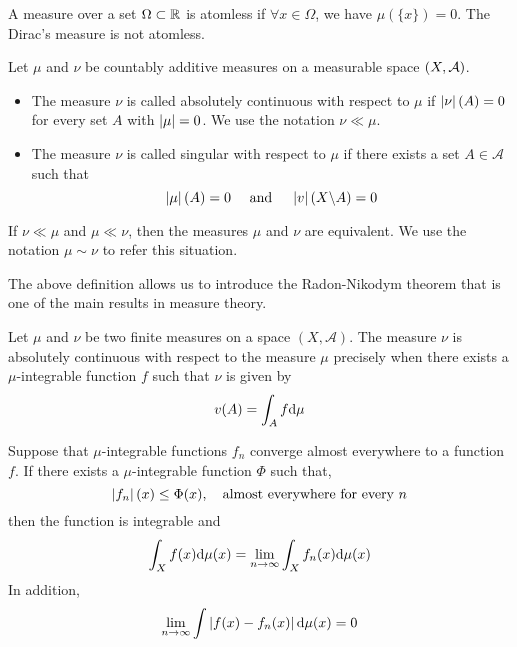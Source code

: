 A measure over a set $\Omega\subset \mathbb{R}$ is atomless if $\forall x \in \Omega$, we have  $\mu(\{x\})=0$. The Dirac's measure is not atomless. 
\begin{definition}
	Let $\mu$ and $\nu$ be countably additive measures on a measurable space $\left( X, \mathcal A \right)$. 
	\begin{itemize}
		\item The measure $\nu$ is called absolutely continuous with respect to $\mu$ if $\left| \nu \right|(A)=0$ for every set $A$ with $\left| \mu \right|=0$. We use the notation $\nu \ll \mu$.
		\item The measure $\nu$ is called singular with respect to $\mu$ if there exists a set $A\in \mathcal{A}$ such that
		\begin{equation*}
			\left| \mu \right|(A)=0 \quad \text{ and }\quad  \left| v \right|(X\backslash A)=0
		\end{equation*}
	\end{itemize}
	
	If $\nu \ll \mu $ and $\mu \ll \nu$, then the measures $\mu$ and $\nu$ are equivalent. We use the notation $\mu \sim \nu$ to refer this situation.
\end{definition}
The above definition allows us to introduce the Radon-Nikodym theorem that is one of the main results in measure theory.
\begin{theorem}
	Let $\mu$ and $\nu$ be two finite measures on a space $(X, \mathcal A)$.
	The measure $\nu$ is absolutely continuous with respect to the measure $\mu$ precisely	when there exists a $\mu$-integrable function $f$ such that $\nu$ is given by
	\begin{equation*}
		v(A)=\int_A f\mathrm{d}\mu
	\end{equation*}
\end{theorem}

\begin{definition}[$L^p$ Spaces]
	
\end{definition}



\begin{theorem}
	Suppose that $\mu$-integrable functions $f_n$ converge almost everywhere to a function $f$. If there exists a $\mu$-integrable function $\Phi$ such that,
	\begin{equation*}
		\left| f_n \right|(x)\leq \Phi (x), \quad \text{almost everywhere for every } n
	\end{equation*}
	then the function is integrable and
	\begin{equation*}
		\int_X f(x)\mathrm{d}\mu(x) = \lim_{n\rightarrow\infty} \int_X f_n(x)\mathrm{d}\mu(x)
	\end{equation*}
	In addition,
	\begin{equation*}
		\lim_{n\rightarrow \infty } \int \left| f(x)-f_n(x) \right|\mathrm{d}\mu(x) =0
	\end{equation*}
\end{theorem}

